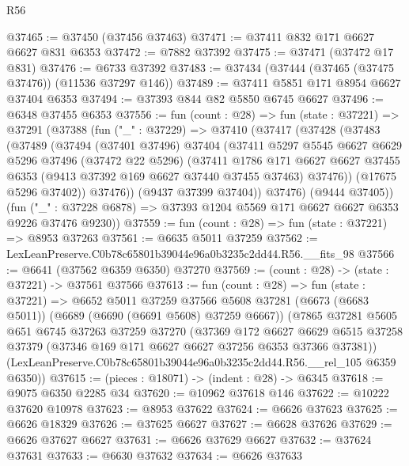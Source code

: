 \begin{lexlean}{R56}
\begin{coremodule}
@37465 := @37450 (@37456 @37463)
@37471 := @37411 @832 @171 @6627 @6627 @831 @6353
@37472 := @7882 @37392
@37475 := @37471 (@37472 @17 @831)
@37476 := @6733 @37392
@37483 := @37434 (@37444 (@37465 (@37475 @37476)) (@11536 @37297 @146))
@37489 := @37411 @5851 @171 @8954 @6627 @37404 @6353
@37494 := @37393 @844 @82 @5850 @6745 @6627
@37496 := @6348 @37455 @6353
@37556 := fun (count : @28) =>
  fun (state : @37221) =>
  @37291
    (@37388
      (fun ("_" : @37229) =>
      @37410
        (@37417
          (@37428
            (@37483
              (@37489
                (@37494
                  (@37401 @37496)
                  @37404
                  (@37411
                    @5297
                    @5545
                    @6627
                    @6629
                    @5296
                    @37496
                    (@37472 @22 @5296)
                    (@37411
                      @1786
                      @171
                      @6627
                      @6627
                      @37455
                      @6353
                      (@9413 @37392 @169 @6627 @37440 @37455 @37463)
                      @37476))
                  (@17675 @5296 @37402))
                @37476))
            (@9437 @37399 @37404))
          @37476)
        (@9444 @37405))
      (fun ("_" : @37228 @6878) => @37393 @1204 @5569 @171 @6627 @6627 @6353 @9226 @37476 @9230))
@37559 := fun (count : @28) => fun (state : @37221) => @8953 @37263
@37561 := @6635 @5011 @37259
@37562 := LexLeanPreserve.C0b78c65801b39044e96a0b3235c2dd44.R56.__fits_98
@37566 := @6641 (@37562 @6359 @6350) @37270
@37569 := (count : @28) -> (state : @37221) -> @37561 @37566
@37613 := fun (count : @28) =>
  fun (state : @37221) =>
  @6652
    @5011
    @37259
    @37566
    @5608
    @37281
    (@6673 (@6683 @5011))
    (@6689 (@6690 (@6691 @5608) @37259 @6667))
    (@7865
      @37281
      @5605
      @651
      @6745
      @37263
      @37259
      @37270
      (@37369
        @172
        @6627
        @6629
        @6515
        @37258
        @37379
        (@37346 @169 @171 @6627 @6627 @37256 @6353 @37366 @37381))
      (LexLeanPreserve.C0b78c65801b39044e96a0b3235c2dd44.R56.__rel_105 @6359 @6350))
@37615 := (pieces : @18071) -> (indent : @28) -> @6345
@37618 := @9075 @6350 @2285 @34
@37620 := @10962 @37618 @146
@37622 := @10222 @37620 @10978
@37623 := @8953 @37622
@37624 := @6626 @37623
@37625 := @6626 @18329
@37626 := @37625 @6627
@37627 := @6628 @37626
@37629 := @6626 @37627 @6627
@37631 := @6626 @37629 @6627
@37632 := @37624 @37631
@37633 := @6630 @37632
@37634 := @6626 @37633

\end{coremodule}
\end{lexlean}
